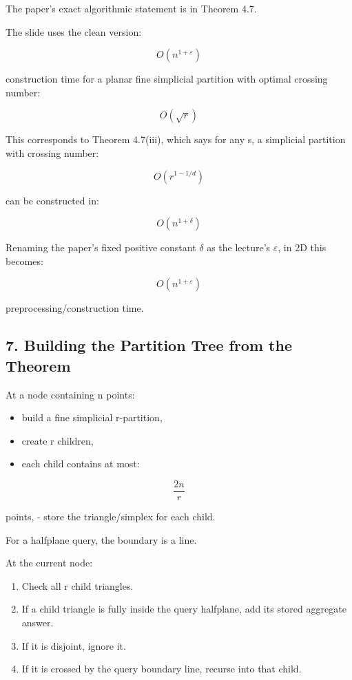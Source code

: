 \documentclass[
  11pt,
]{article}
\providecommand{\tightlist}{%
  \setlength{\itemsep}{0pt}\setlength{\parskip}{0pt}}
\begin{document}
The paper's exact algorithmic statement is in Theorem 4.7.

The slide uses the clean version:

\[
O(n^{1+\varepsilon})
\]

construction time for a planar fine simplicial partition with optimal
crossing number:

\[
O(\sqrt r)
\]

This corresponds to Theorem 4.7(iii), which says for any s, a simplicial
partition with crossing number:

\[
O(r^{1-1/d})
\]

can be constructed in:

\[
O(n^{1+\delta})
\]

Renaming the paper's fixed positive constant \(\delta\) as the lecture's
\(\varepsilon\), in 2D this becomes:

\[
O(n^{1+\varepsilon})
\]

preprocessing/construction time.

\hypertarget{building-the-partition-tree-from-the-theorem}{%
\subsection{7. Building the Partition Tree from the
Theorem}\label{building-the-partition-tree-from-the-theorem}}

At a node containing n points:

\begin{itemize}
\tightlist
\item
  build a fine simplicial r-partition,
\item
  create r children,
\item
  each child contains at most:
\end{itemize}

\[
\frac{2n}{r}
\]

points, - store the triangle/simplex for each child.

For a halfplane query, the boundary is a line.

At the current node:

\begin{enumerate}
\def\labelenumi{\arabic{enumi}.}
\tightlist
\item
  Check all r child triangles.
\item
  If a child triangle is fully inside the query halfplane, add its
  stored aggregate answer.
\item
  If it is disjoint, ignore it.
\item
  If it is crossed by the query boundary line, recurse into that child.
\end{enumerate}
\end{document}
